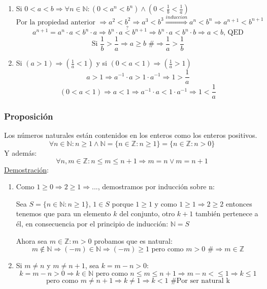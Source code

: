 \documentclass[10pt,a4paper,openright]{book}
\begin{document}
\begin{enumerate}
\item Si $0<a<b\Rightarrow \forall n \in \mathbb N : (0<a^n<b^n)\wedge (0<\frac{1}{b}<\frac{1}{a})$
$$\mbox{Por la propiedad anterior }\Rightarrow a^2<b^2\Rightarrow a^3<b^3\stackrel{induccion}{\Rightarrow} a^n<b^n\Rightarrow a^{n+1}<b^{n+1}$$
$$a^{n+1}=a^n\cdot a<b^n\cdot a\Rightarrow b^n\cdot a\stackrel{?}{<}b^{n+1}\Rightarrow b^n\cdot a< b^n\cdot b \Rightarrow a<b \mbox{, QED}$$
\vspace{0.25cm}
$$\mbox{Si } \frac{1}{b}>\frac{1}{a}\Rightarrow a\geq b \mbox{ \#}\Rightarrow \frac{1}{a}>\frac{1}{b}$$
\vspace{0.5cm}

\item Si $(a>1)\Rightarrow (\frac{1}{a}<1)$ y si $(0<a<1)\Rightarrow (\frac{1}{a}>1)$
$$a>1\Rightarrow a^{-1}\cdot a>1\cdot a^{-1}\Rightarrow 1>\frac{1}{a}$$
$$(0<a<1)\Rightarrow a<1\Rightarrow a^{-1}\cdot a<1\cdot a^{-1}\Rightarrow 1<\frac{1}{a}$$
\end{enumerate}

\subsubsection*{Proposición}
Los números naturales están contenidos en los enteros como los enteros positivos.
$$\forall n \in \mathbb N: n\geq 1 \wedge \mathbb N =\{n\in \mathbb Z: n\geq 1\}=\{n\in \mathbb Z : n>0\}$$
Y además:
$$\forall n,m\in \mathbb Z : n\leq m\leq n+1\Rightarrow m=n\vee m=n+1$$
\underline{Demostración}:
\begin{enumerate}
\item Como $1\geq 0\Rightarrow 2\geq 1 \Rightarrow ...$, demostramos por inducción sobre n:\par
Sea $S=\{n\in \mathbb N: n\geq 1\}$, $1\in S$ porque $1\geq 1$ y como $1\geq 1\Rightarrow 2\geq 2$ entonces tenemos que para un elemento $k$ del conjunto, otro $k+1$ también pertenece a él, en consecuencia por el principio de inducción: $\mathbb N=S$\par
Ahora sea $m\in \mathbb Z: m>0$ probamos  que es natural:
$$m\notin \mathbb N \Rightarrow (-m)\in \mathbb N \Rightarrow (-m)\geq  1\mbox{ pero como }m>0 \mbox{ \#}\Rightarrow m\in \mathbb Z$$
\vspace{0.5cm}
\item Si $m\neq n$ y $m\neq n+1$, sea $k=m-n>0$:
$$k=m-n>0\Rightarrow k\in \mathbb N \mbox{ pero como }n\leq m \leq n+1\Rightarrow m-n<\leq 1 \Rightarrow k\leq 1$$
$$\mbox{ pero como }m\neq n+1\Rightarrow k\neq 1\Rightarrow k<1\mbox{ \# Por ser natural k }$$
\end{enumerate}
\end{document}
